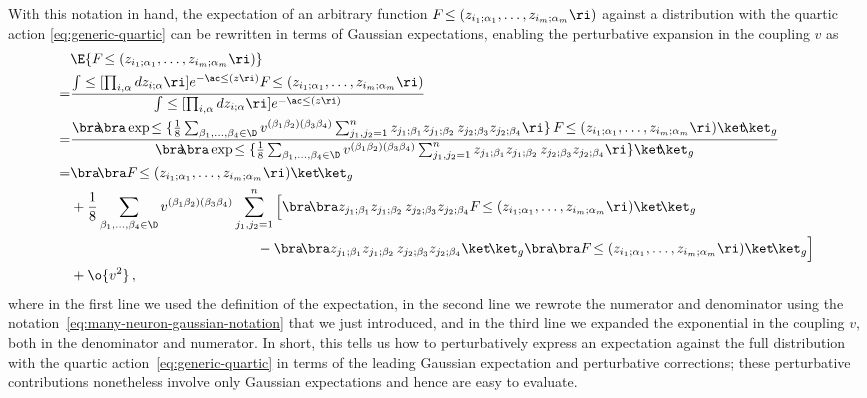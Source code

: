 With this notation in hand, the expectation of an arbitrary function $F\!\le(z_{i_1;\alpha_1},\ldots, z_{i_{m};\alpha_m}\ri)$ against a distribution with the quartic action \eqref{eq:generic-quartic} can be rewritten in terms of Gaussian expectations, enabling the perturbative expansion in the coupling $v$ as
\begin{align}\label{eq:arbitrary-function-quartic-expectation}
&\E{F\!\le(z_{i_1;\alpha_1},\ldots, z_{i_{m};\alpha_m}\ri)}\, \\
=&\frac{\int \le[\prod_{i,\alpha} d z_{i;\alpha}\ri] e^{-\ac\le(z\ri)}F\!\le(z_{i_1;\alpha_1},\ldots, z_{i_{m};\alpha_m}\ri)}{\int \le[\prod_{i,\alpha} d z_{i;\alpha}\ri] e^{-\ac\le(z\ri)}}\,  \nonumber \\
=&\frac{\bra\!\!\bra \exp\!\le\{\frac{1}{8}\sum_{\beta_1,\ldots,\beta_4\in\D}v^{(\beta_1\beta_2)(\beta_3\beta_4)}\sum_{j_1,j_2=1}^{n} z_{j_1;\beta_1}z_{j_1;\beta_2}\, z_{j_2;\beta_3}z_{j_2;\beta_4} \ri\}\,F\!\le(z_{i_1;\alpha_1},\ldots, z_{i_{m};\alpha_m}\ri)\ket\!\!\ket_{g}}{\bra\!\!\bra \exp\!\le\{\frac{1}{8}\sum_{\beta_1,\ldots,\beta_4\in\D}v^{(\beta_1\beta_2)(\beta_3\beta_4)}\sum_{j_1,j_2=1}^{n} z_{j_1;\beta_1}z_{j_1;\beta_2}\, z_{j_2;\beta_3}z_{j_2;\beta_4} \ri\}\ket\!\!\ket_{g}}\,  \nonumber\\
=&\bra\!\bra F\!\le(z_{i_1;\alpha_1},\ldots, z_{i_{m};\alpha_m}\ri)\ket\!\ket_{g}\, \nonumber\\
&+\frac{1}{8}\sum_{\beta_1,\ldots,\beta_4\in\D}v^{(\beta_1\beta_2)(\beta_3\beta_4)}\sum_{j_1,j_2=1}^{n}\Big[\bra\!\bra z_{j_1;\beta_1}z_{j_1;\beta_2}\, z_{j_2;\beta_3}z_{j_2;\beta_4} F\!\le(z_{i_1;\alpha_1},\ldots, z_{i_{m};\alpha_m}\ri)  \ket\!\ket_{g}\, \nonumber\\
&\quad \quad \quad \quad \quad \quad \quad \quad \quad \quad \quad \quad \quad \ -\bra\!\bra z_{j_1;\beta_1}z_{j_1;\beta_2}\, z_{j_2;\beta_3}z_{j_2;\beta_4} \ket\!\ket_{g}\bra\!\bra F\!\le(z_{i_1;\alpha_1},\ldots, z_{i_{m};\alpha_m}\ri)\ket\!\ket_{g}\Big]\, \nonumber\\
&+\o{v^2}\, ,\nonumber
\end{align}
where in the first line we used the definition of the expectation, in the second line we rewrote the numerator and denominator using the notation~\eqref{eq:many-neuron-gaussian-notation} that we just introduced, and in the third line we expanded the exponential in the coupling $v$, both in the denominator and numerator. %
In short, this tells us how to perturbatively express an expectation against the full distribution with the quartic action~\eqref{eq:generic-quartic}  in terms of the leading Gaussian expectation and perturbative corrections; these perturbative contributions nonetheless involve only Gaussian expectations and hence are easy to evaluate.

